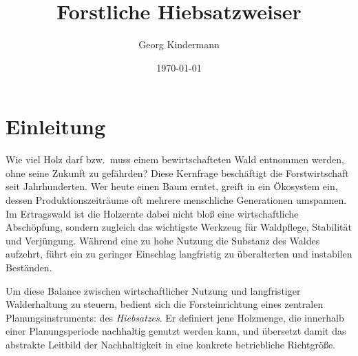 \documentclass[twocolumn, paper=a4, fontsize=10pt]{scrartcl}
\begin{document}
\title{Forstliche Hiebsatzweiser}
\author{Georg Kindermann}
\date{\today}


\tableofcontents
\vspace{2ex}

\section{Einleitung}

Wie viel Holz darf bzw.\ muss einem bewirtschafteten Wald entnommen werden, ohne seine Zukunft zu gefährden? Diese Kernfrage beschäftigt die Forstwirtschaft seit Jahrhunderten. Wer heute einen Baum erntet, greift in ein Ökosystem ein, dessen Produktionszeiträume oft mehrere menschliche Generationen umspannen. Im Ertragswald ist die Holzernte dabei nicht bloß eine wirtschaftliche Abschöpfung, sondern zugleich das wichtigste Werkzeug für Waldpflege, Stabilität und Verjüngung. Während eine zu hohe Nutzung die Substanz des Waldes aufzehrt, führt ein zu geringer Einschlag langfristig zu überalterten und instabilen Beständen.

Um diese Balance zwischen wirtschaftlicher Nutzung und langfristiger Walderhaltung zu steuern, bedient sich die Forsteinrichtung eines zentralen Planungsinstruments: des \emph{Hiebsatzes}. Er definiert jene Holzmenge, die innerhalb einer Planungsperiode nachhaltig genutzt werden kann, und übersetzt damit das abstrakte Leitbild der Nachhaltigkeit in eine konkrete betriebliche Richtgröße.
\end{document}

